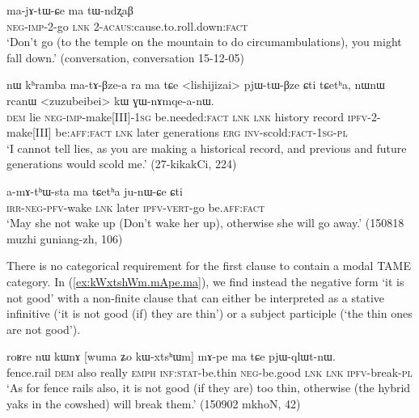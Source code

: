 \begin{exe}
\ex \label{ex:ma.tWndzxaB}
\gll  ma-jɤ-tɯ-ɕe ma tɯ-ndʐaβ \\
\textsc{neg}-\textsc{imp}-2-go \textsc{lnk} 2-\textsc{acaus}:cause.to.roll.down:\textsc{fact} \\
\glt `Don't go (to the temple on the mountain to do circumambulations), you might fall down.' (conversation, conversation 15-12-05)
\end{exe}

\begin{exe}
\ex \label{ex:matABzea}
\gll nɯ kʰramba ma-tɤ-βze-a ra ma tɕe <lishijizai> pjɯ-tɯ-βze ɕti tɕetʰa, nɯnɯ rcanɯ <zuzubeibei> kɯ ɣɯ-nɤmqe-a-nɯ.  \\
\textsc{dem}  lie \textsc{neg}-\textsc{imp}-make[III]-\textsc{1sg} be.needed:\textsc{fact} \textsc{lnk} \textsc{lnk}   history record \textsc{ipfv}-2-make[III] be:\textsc{aff}:\textsc{fact} \textsc{lnk} later generations \textsc{erg}  \textsc{inv}-scold:\textsc{fact}-\textsc{1sg}-\textsc{pl} \\
\glt `I cannot tell lies, as   you are making a historical record, and previous and future generations would scold me.'  (27-kikakCi, 224)
 \end{exe}

\begin{exe}
\ex \label{ex:ma.tCetha.junWCe}
\gll a-mɤ-tʰɯ-sta ma tɕetʰa ju-nɯ-ɕe ɕti \\
\textsc{irr}-\textsc{neg}-\textsc{pfv}-wake \textsc{lnk} later \textsc{ipfv}-\textsc{vert}-go be.\textsc{aff}:\textsc{fact} \\
\glt `May she not wake up (Don't wake her up), otherwise she will go away.' (150818 muzhi guniang-zh, 106)
\end{exe}  

There is no categorical requirement for the first clause to contain a modal TAME category. In (\ref{ex:kWxtshWm.mApe.ma}), we find instead the negative form  `it is not good' with a non-finite clause that can either be interpreted as a stative infinitive (`it is not good (if) they are thin') or a subject participle (`the thin ones are not good').

\begin{exe}
\ex \label{ex:kWxtshWm.mApe.ma}
\gll roʁre nɯ kɯnɤ [wuma ʑo kɯ-xtsʰɯm] mɤ-pe ma tɕe pjɯ-qlɯt-nɯ. \\
fence.rail \textsc{dem} also really \textsc{emph} \textsc{inf}:\textsc{stat}-be.thin \textsc{neg}-be.good \textsc{lnk} \textsc{lnk} \textsc{ipfv}-break-\textsc{pl} \\
\glt `As for fence rails also, it is not good (if they are) too thin, otherwise (the hybrid yaks in the cowshed) will break them.' (150902 mkhoN, 42)
\end{exe}  

